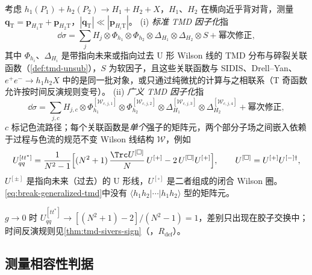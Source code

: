 \begin{definition}\label{def:break-generalized-tmd}
考虑 $h_1(P_1)+h_2(P_2)\to H_1+H_2+X$，$H_1$、$H_2$ 在横向近乎背对背，测量 $\boldsymbol q_{\mathrm T}=\boldsymbol p_{H_1\mathrm T}+\boldsymbol p_{H_2\mathrm T}$，$|\boldsymbol q_{\mathrm T}|\ll|\boldsymbol p_{H_i\mathrm T}|$。
(i) \emph{标准 TMD 因子化}指
\begin{equation}\label{eq:break-standard-tmd}
\dd\sigma=\sum_j H_j\otimes\Phi_{h_1}\otimes\Phi_{h_2}\otimes\Delta_{H_1}\otimes\Delta_{H_2}\otimes S+\text{幂次修正},
\end{equation}
其中 $\Phi_{h_i}$、$\Delta_{H_i}$ 是带指向未来或指向过去 U 形 Wilson 线的 TMD 分布与碎裂关联函数（\cref{def:tmd-unsub}），$S$ 为软因子，且这些关联函数与 SIDIS、Drell--Yan、$e^+e^-\to h_1h_2X$ 中的是同一批对象，或只通过纯微扰的计算与之相联系\cite{Collins2007}（T 奇函数允许按时间反演规则变号）。
(ii) \emph{广义 TMD 因子化}\cite{BacchettaBomhofMuldersPijlman2005,Bomhof:2004aw,Bomhof:2006dp}指
\begin{equation}\label{eq:break-generalized-tmd}
\dd\sigma=\sum_{j,c}H_{j,c}\otimes\Phi^{[\mathcal W_{c,j,1}]}_{h_1}\otimes\Phi^{[\mathcal W_{c,j,2}]}_{h_2}\otimes\Delta^{[\mathcal W_{c,j,3}]}_{H_1}\otimes\Delta^{[\mathcal W_{c,j,4}]}_{H_2}+\text{幂次修正},
\end{equation}
$c$ 标记色流路径；每个关联函数是\emph{单个}强子的矩阵元，两个部分子场之间嵌入依赖于过程与色流的规范不变 Wilson 线结构 $\mathcal W$，例如\cite[式~(A11a)]{BacchettaBomhofMuldersPijlman2005}
\begin{equation}\label{eq:break-bbmp-link}
U^{[tt^*]}_{qq}=\frac{1}{N^2-1}\Big[(N^2+1)\,\frac{\Trc U^{[\square]}}{N}\,U^{[+]}-2\,U^{[\square]}U^{[+]}\Big],\qquad U^{[\square]}=U^{[+]}U^{[-]\dagger},
\end{equation}
$U^{[\pm]}$ 是指向未来（过去）的 U 形线，$U^{[\square]}$ 是二者组成的闭合 Wilson 圈。\cref{eq:break-generalized-tmd}中没有 $\langle h_1h_2|\cdots|h_1h_2\rangle$ 型的矩阵元\cite[式~(3)]{RogersMulders2010}。
\end{definition}

$g\to0$ 时 $U^{[tt^*]}_{qq}\to[(N^2+1)-2]/(N^2-1)=1$，差别只出现在胶子交换中；时间反演规则见\cref{thm:tmd-sivers-sign}（\tagR，$R_{\mathrm{def}}$）。

\subsection{测量相容性判据}

